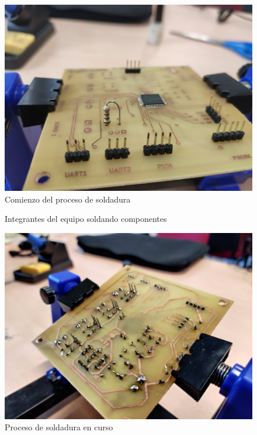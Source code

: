 \begin{itemize}
    \begin{figure}[H]
    \centering 
    \includegraphics[width=0.55\linewidth]{pictures/PreSoldado.jpg}
    \caption{Comienzo del proceso de soldadura}
    \label{fig:kdiagram}
    \end{figure}
    
    \begin{figure}[H]
    \centering
    \caption{Integrantes del equipo soldando componentes}
    \label{fig:lego}
    \end{figure}
    
    \begin{figure}[H]
    \centering 
    \includegraphics[width=0.45\linewidth]{pictures/PreSoldado2.jpg}
    \caption{Proceso de soldadura en curso}
    \label{fig:kdiagram}
    \end{figure}
    

\end{itemize}
